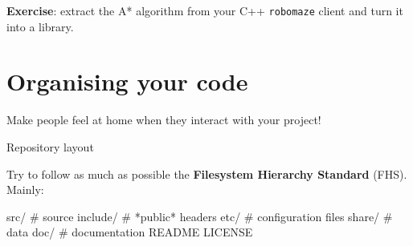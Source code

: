 \documentclass[compress]{beamer}
\begin{document}
\begin{frame}[plain]{}
    \begin{center}
        \Large
        {\bf Exercise}: extract the A* algorithm from your C++ {\tt robomaze} client and turn it into a library.
    \end{center}

\end{frame}


\section[Organising]{Organising your code}

\begin{frame}{}
    \centering


    Make people feel at home when they interact with your project!

\end{frame}

\begin{frame}[fragile, label=FHS]{Repository layout}

Try to follow as much as possible the {\bf Filesystem Hierarchy
 Standard} (FHS). Mainly:

\begin{shcode}
src/        # source
include/    # *public* headers
etc/        # configuration files
share/      # data
doc/        # documentation
README
LICENSE
\end{shcode}

\centering


\end{frame}
\end{document}
